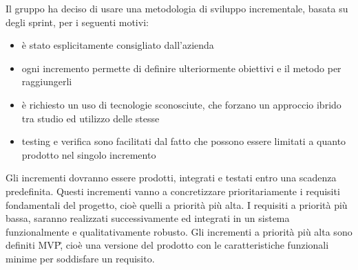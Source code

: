 Il gruppo ha deciso di usare una metodologia di sviluppo incrementale, basata su degli sprint, per i seguenti motivi:
\begin{itemize}
    \item 
        è stato esplicitamente consigliato dall'azienda
    \item 
        ogni incremento permette di definire ulteriormente 
        obiettivi e il metodo per raggiungerli
    \item 
        è richiesto un uso di tecnologie sconosciute, che forzano un 
        approccio ibrido tra studio ed utilizzo delle stesse
    \item
        testing e verifica sono facilitati dal fatto che possono essere 
        limitati a quanto prodotto nel singolo incremento
\end{itemize}
Gli incrementi dovranno essere prodotti, integrati e testati entro una scadenza predefinita. Questi incrementi vanno a concretizzare prioritariamente i requisiti fondamentali del progetto, cioè quelli a priorità più alta. I requisiti a priorità più bassa, saranno realizzati successivamente ed integrati in un sistema funzionalmente e qualitativamente robusto.
Gli incrementi a priorità più alta sono definiti MVP\G, cioè una versione del prodotto con le caratteristiche funzionali minime per soddisfare un requisito.




